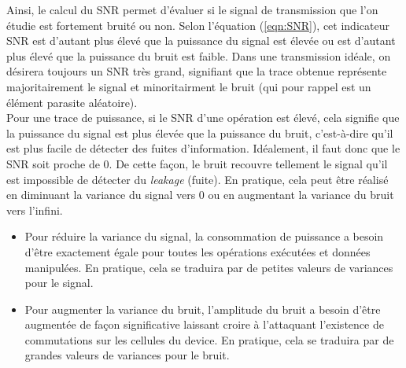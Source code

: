 \documentclass[oneside]{book}
\begin{document}
\vspace{-0.2 cm}Ainsi, le calcul du SNR permet d'évaluer si le signal de transmission que l'on étudie est fortement bruité ou non. Selon l'équation (\ref{eqn:SNR}), cet indicateur SNR est d'autant plus élevé que la puissance du signal est élevée ou est d'autant plus élevé que la puissance du bruit est faible. Dans une transmission idéale, on désirera toujours un SNR très grand, signifiant que la trace obtenue représente majoritairement le signal et minoritairment le bruit (qui pour rappel est un élément parasite aléatoire). \\
Pour une trace de puissance, si le SNR d'une opération est élevé, cela signifie que la puissance du signal est plus élevée que la puissance du bruit, c'est-à-dire qu'il est plus facile de détecter des fuites d'information. Idéalement, il faut donc que le SNR soit proche de 0. De cette façon, le bruit recouvre tellement le signal qu'il est impossible de détecter du \textit{leakage} (fuite). En pratique, cela peut être réalisé en diminuant la variance du signal vers 0 ou en augmentant la variance du bruit vers l'infini.
\begin{itemize}
\item Pour réduire la variance du signal, la consommation de puissance a besoin d'être exactement égale pour toutes les opérations exécutées et données manipulées. En pratique, cela se traduira par de petites valeurs de variances pour le signal.
\item Pour augmenter la variance du bruit, l'amplitude du bruit a besoin d'être augmentée de façon significative laissant croire à l'attaquant l'existence de commutations sur les cellules du device. En pratique, cela se traduira par de grandes valeurs de variances pour le bruit.
\end{itemize}

\newpage
\end{document}

